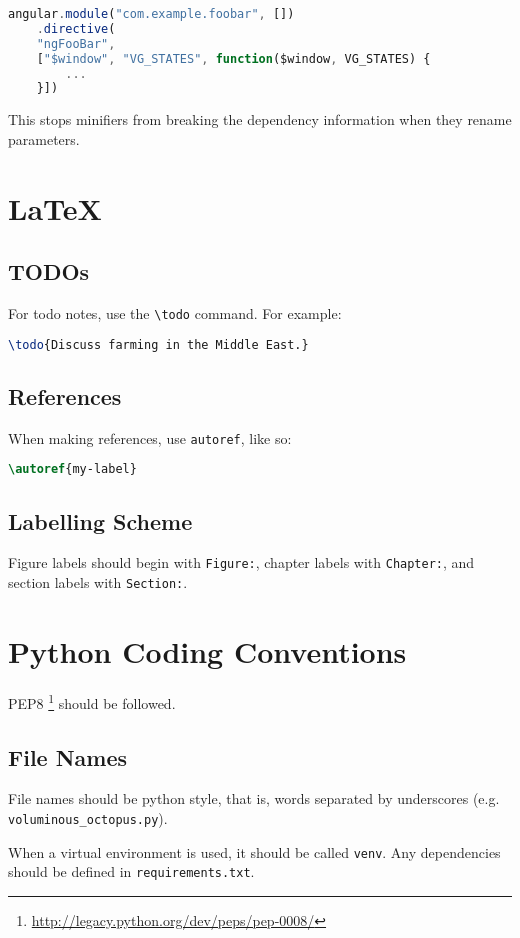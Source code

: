 \begin{lstlisting}[language=javascript]
angular.module("com.example.foobar", [])
    .directive(
    "ngFooBar",
    ["$window", "VG_STATES", function($window, VG_STATES) {
        ...
    }])
\end{lstlisting}

This stops minifiers from breaking the dependency information when they
rename parameters.

\section{LaTeX}

\subsection{TODOs}

For todo notes, use the \texttt{\textbackslash{}todo} command. For
example:

\begin{lstlisting}[language=tex]
\todo{Discuss farming in the Middle East.}
\end{lstlisting}

\subsection{References}

When making references, use \texttt{autoref}, like so:

\begin{lstlisting}[language=tex]
\autoref{my-label}
\end{lstlisting}

\subsection{Labelling Scheme}

Figure labels should begin with \texttt{Figure:}, chapter labels with
\texttt{Chapter:}, and section labels with \texttt{Section:}.

\section{Python Coding Conventions}

PEP8 \footnote{\url{http://legacy.python.org/dev/peps/pep-0008/}} should be
followed.

\subsection{File Names}

File names should be python style, that is, words separated by
underscores (e.g. \texttt{voluminous\_octopus.py}).

When a virtual environment is used, it should be called \texttt{venv}.
Any dependencies should be defined in \texttt{requirements.txt}.
